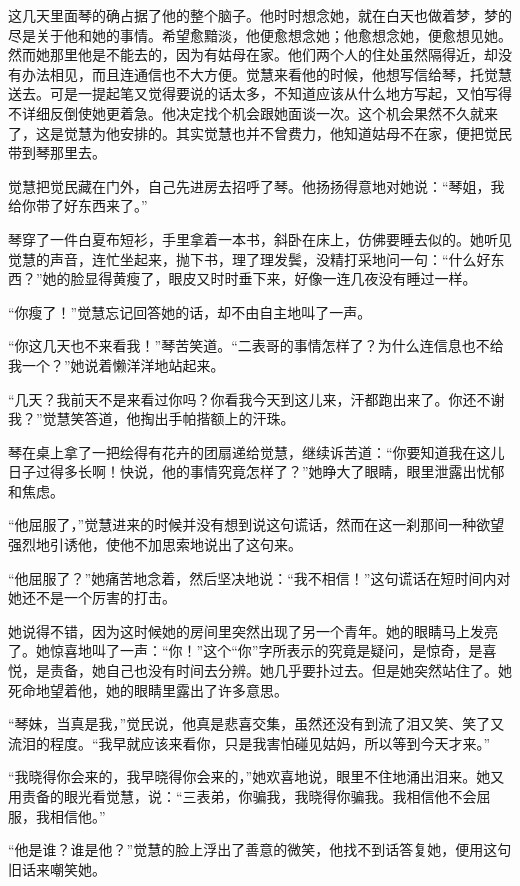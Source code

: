 \par 这几天里面琴的确占据了他的整个脑子。他时时想念她，就在白天也做着梦，梦的尽是关于他和她的事情。希望愈黯淡，他便愈想念她；他愈想念她，便愈想见她。然而她那里他是不能去的，因为有姑母在家。他们两个人的住处虽然隔得近，却没有办法相见，而且连通信也不大方便。觉慧来看他的时候，他想写信给琴，托觉慧送去。可是一提起笔又觉得要说的话太多，不知道应该从什么地方写起，又怕写得不详细反倒使她更着急。他决定找个机会跟她面谈一次。这个机会果然不久就来了，这是觉慧为他安排的。其实觉慧也并不曾费力，他知道姑母不在家，便把觉民带到琴那里去。
\par 觉慧把觉民藏在门外，自己先进房去招呼了琴。他扬扬得意地对她说：“琴姐，我给你带了好东西来了。”
\par 琴穿了一件白夏布短衫，手里拿着一本书，斜卧在床上，仿佛要睡去似的。她听见觉慧的声音，连忙坐起来，抛下书，理了理发鬓，没精打采地问一句：“什么好东西？”她的脸显得黄瘦了，眼皮又时时垂下来，好像一连几夜没有睡过一样。
\par “你瘦了！”觉慧忘记回答她的话，却不由自主地叫了一声。
\par “你这几天也不来看我！”琴苦笑道。“二表哥的事情怎样了？为什么连信息也不给我一个？”她说着懒洋洋地站起来。
\par “几天？我前天不是来看过你吗？你看我今天到这儿来，汗都跑出来了。你还不谢我？”觉慧笑答道，他掏出手帕揩额上的汗珠。
\par 琴在桌上拿了一把绘得有花卉的团扇递给觉慧，继续诉苦道：“你要知道我在这儿日子过得多长啊！快说，他的事情究竟怎样了？”她睁大了眼睛，眼里泄露出忧郁和焦虑。
\par “他屈服了，”觉慧进来的时候并没有想到说这句谎话，然而在这一刹那间一种欲望强烈地引诱他，使他不加思索地说出了这句来。
\par “他屈服了？”她痛苦地念着，然后坚决地说：“我不相信！”这句谎话在短时间内对她还不是一个厉害的打击。
\par 她说得不错，因为这时候她的房间里突然出现了另一个青年。她的眼睛马上发亮了。她惊喜地叫了一声：“你！”这个“你”字所表示的究竟是疑问，是惊奇，是喜悦，是责备，她自己也没有时间去分辨。她几乎要扑过去。但是她突然站住了。她死命地望着他，她的眼睛里露出了许多意思。
\par “琴妹，当真是我，”觉民说，他真是悲喜交集，虽然还没有到流了泪又笑、笑了又流泪的程度。“我早就应该来看你，只是我害怕碰见姑妈，所以等到今天才来。”
\par “我晓得你会来的，我早晓得你会来的，”她欢喜地说，眼里不住地涌出泪来。她又用责备的眼光看觉慧，说：“三表弟，你骗我，我晓得你骗我。我相信他不会屈服，我相信他。”
\par “他是谁？谁是他？”觉慧的脸上浮出了善意的微笑，他找不到话答复她，便用这句旧话来嘲笑她。
